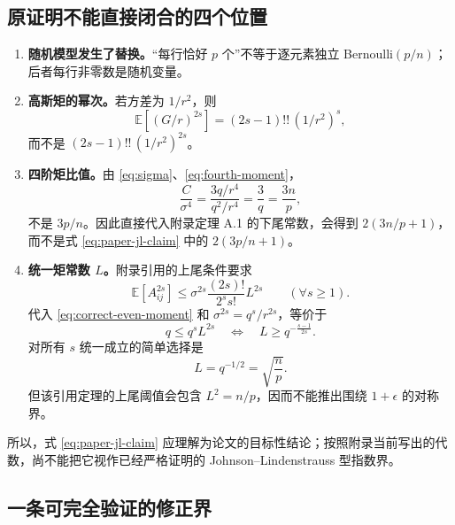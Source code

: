 \documentclass[11pt]{article}
\numberwithin{equation}{section}
\newcommand{\E}{\mathbb{E}}
\newcommand{\1}{\mathbf{1}}
\begin{document}
\subsection{原证明不能直接闭合的四个位置}

\begin{enumerate}[label=\arabic*.]
  \item \textbf{随机模型发生了替换。}“每行恰好 $p$ 个”不等于逐元素独立 Bernoulli$(p/n)$；后者每行非零数是随机变量。
  \item \textbf{高斯矩的幂次。}若方差为 $1/r^2$，则
  \begin{equation}
    \E[(G/r)^{2s}]=(2s-1)!!\,(1/r^2)^s,
  \end{equation}
  而不是 $(2s-1)!!\,(1/r^2)^{2s}$。
  \item \textbf{四阶矩比值。}由 \eqref{eq:sigma}、\eqref{eq:fourth-moment}，
  \begin{equation}
    \frac{C}{\sigma^4}
    =\frac{3q/r^4}{q^2/r^4}
    =\frac3q
    =\frac{3n}{p},
    \label{eq:C-ratio}
  \end{equation}
  不是 $3p/n$。因此直接代入附录定理 A.1 的下尾常数，会得到 $2(3n/p+1)$，而不是式 \eqref{eq:paper-jl-claim} 中的 $2(3p/n+1)$。
  \item \textbf{统一矩常数 $L$。}附录引用的上尾条件要求
  \begin{equation}
    \E[A_{ij}^{2s}]
    \le \sigma^{2s}\frac{(2s)!}{2^s s!}L^{2s}
    \qquad(\forall s\ge1).
  \end{equation}
  代入 \eqref{eq:correct-even-moment} 和 $\sigma^{2s}=q^s/r^{2s}$，等价于
  \begin{equation}
    q\le q^sL^{2s}
    \quad\Longleftrightarrow\quad
    L\ge q^{-\frac{s-1}{2s}}.
  \end{equation}
  对所有 $s$ 统一成立的简单选择是
  \begin{equation}
    L=q^{-1/2}=\sqrt{\frac np}.
    \label{eq:valid-L}
  \end{equation}
  但该引用定理的上尾阈值会包含 $L^2=n/p$，因而不能推出围绕 $1+\epsilon$ 的对称界。
\end{enumerate}

所以，式 \eqref{eq:paper-jl-claim} 应理解为论文的目标性结论；按照附录当前写出的代数，尚不能把它视作已经严格证明的 Johnson--Lindenstrauss 型指数界。

\subsection{一条可完全验证的修正界}
\end{document}
